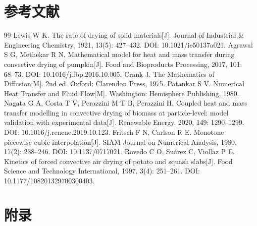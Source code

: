\documentclass[UTF8,a4paper,zihao=-4,fontset=fandol]{ctexart}
\newcommand{\blankcontent}{\par\noindent\strut\par}
\begin{document}
\section*{参考文献}
\begingroup
\renewcommand{\refname}{}
\vspace{-2em}
\begin{thebibliography}{99}
   Lewis W K. The rate of drying of solid materials[J]. Journal of Industrial \& Engineering Chemistry, 1921, 13(5): 427--432. DOI: 10.1021/ie50137a021.
   Agrawal S G, Methekar R N. Mathematical model for heat and mass transfer during convective drying of pumpkin[J]. Food and Bioproducts Processing, 2017, 101: 68--73. DOI: 10.1016/j.fbp.2016.10.005.
   Crank J. The Mathematics of Diffusion[M]. 2nd ed. Oxford: Clarendon Press, 1975.
   Patankar S V. Numerical Heat Transfer and Fluid Flow[M]. Washington: Hemisphere Publishing, 1980.
   Nagata G A, Costa T V, Perazzini M T B, Perazzini H. Coupled heat and mass transfer modelling in convective drying of biomass at particle-level: model validation with experimental data[J]. Renewable Energy, 2020, 149: 1290--1299. DOI: 10.1016/j.renene.2019.10.123.
   Fritsch F N, Carlson R E. Monotone piecewise cubic interpolation[J]. SIAM Journal on Numerical Analysis, 1980, 17(2): 238--246. DOI: 10.1137/0717021.
   Rovedo C O, Suárez C, Viollaz P E. Kinetics of forced convective air drying of potato and squash slabs[J]. Food Science and Technology International, 1997, 3(4): 251--261. DOI: 10.1177/108201329700300403.
\end{thebibliography}
\endgroup

\clearpage
\section*{附录}
\appendix
{}
\end{document}
